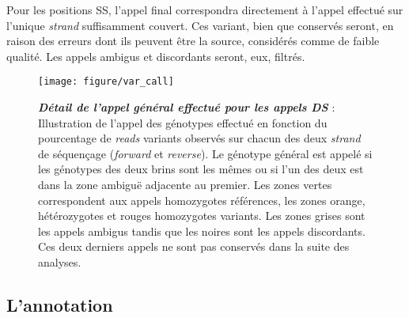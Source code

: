\documentclass[12pt,twoside]{ugathesis}
\begin{document}
Pour les positions SS, l'appel final correspondra directement à l'appel
effectué sur l'unique \emph{strand} suffisamment couvert. Ces variant,
bien que conservés seront, en raison des erreurs dont ils peuvent être
la source, considérés comme de faible qualité. Les appels ambigus et
discordants seront, eux, filtrés.

\newpage

\begin{figure}

{\centering \texttt{[image: figure/var\_call]} 

}

\caption[Détail de l'appel général effectué pour les appels DS]{\textbf{\emph{Détail de l'appel général effectué pour
les appels DS}} : Illustration de l'appel des génotypes effectué en
fonction du pourcentage de \emph{reads} variants observés sur chacun des
deux \emph{strand} de séquençage (\emph{forward} et \emph{reverse}). Le
génotype général est appelé si les génotypes des deux brins sont les
mêmes ou si l'un des deux est dans la zone ambiguë adjacente au premier.
Les zones vertes correspondent aux appels homozygotes références, les
zones orange, hétérozygotes et rouges homozygotes variants. Les zones
grises sont les appels ambigus tandis que les noires sont les appels
discordants. Ces deux derniers appels ne sont pas conservés dans la
suite des analyses.}\label{fig:picvarcall}
\end{figure}













\newpage

\subsection{L'annotation}\label{lannotation}
\end{document}
